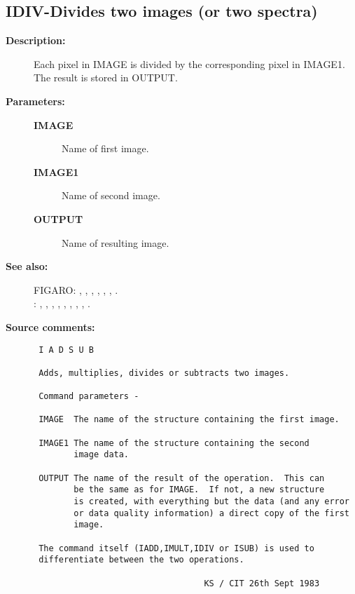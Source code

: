 \subsection{IDIV-\label{IDIV}Divides two images (or two spectra)}
\begin{description}

\item [{\bf Description:}]
 Each pixel in IMAGE is divided by the corresponding
 pixel in IMAGE1.  The result is stored in OUTPUT.

\item [{\bf Parameters:}]
\begin{description}
\item [{\bf IMAGE}]
 Name of first image.
\item [{\bf IMAGE1}]
 Name of second image.
\item [{\bf OUTPUT}]
 Name of resulting image.
\end{description}

\item [{\bf See also:}]
FIGARO: , , , , , , .\\
: , , , , , , , , .\\

\item [{\bf Source comments:}]
\begin{verbatim}
 I A D S U B

 Adds, multiplies, divides or subtracts two images.

 Command parameters -

 IMAGE  The name of the structure containing the first image.

 IMAGE1 The name of the structure containing the second
        image data.

 OUTPUT The name of the result of the operation.  This can
        be the same as for IMAGE.  If not, a new structure
        is created, with everything but the data (and any error
        or data quality information) a direct copy of the first
        image.

 The command itself (IADD,IMULT,IDIV or ISUB) is used to
 differentiate between the two operations.

                                  KS / CIT 26th Sept 1983
\end{verbatim}
\end{description}
